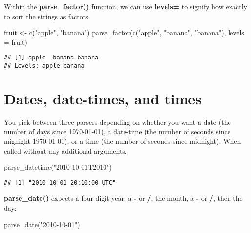 \documentclass[
]{article}
\newenvironment{Shaded}{\begin{snugshade}}{\end{snugshade}}
\newcommand{\AttributeTok}[1]{\textcolor[rgb]{0.77,0.63,0.00}{#1}}
\newcommand{\FunctionTok}[1]{\textcolor[rgb]{0.00,0.00,0.00}{#1}}
\newcommand{\NormalTok}[1]{#1}
\newcommand{\OtherTok}[1]{\textcolor[rgb]{0.56,0.35,0.01}{#1}}
\newcommand{\StringTok}[1]{\textcolor[rgb]{0.31,0.60,0.02}{#1}}
\begin{document}
Within the \textbf{parse\_factor()} function, we can use
\textbf{levels=} to signify how exactly to sort the strings as factors.

\begin{Shaded}
\begin{Highlighting}[]
\NormalTok{fruit }\OtherTok{\textless{}{-}} \FunctionTok{c}\NormalTok{(}\StringTok{"apple"}\NormalTok{, }\StringTok{"banana"}\NormalTok{)}
\FunctionTok{parse\_factor}\NormalTok{(}\FunctionTok{c}\NormalTok{(}\StringTok{"apple"}\NormalTok{, }\StringTok{"banana"}\NormalTok{, }\StringTok{"banana"}\NormalTok{), }\AttributeTok{levels =}\NormalTok{ fruit)}
\end{Highlighting}
\end{Shaded}

\begin{verbatim}
## [1] apple  banana banana
## Levels: apple banana
\end{verbatim}

\hypertarget{dates-date-times-and-times}{%
\section{\texorpdfstring{\textbf{Dates, date-times, and
times}}{Dates, date-times, and times}}\label{dates-date-times-and-times}}

You pick between three parsers depending on whether you want a date (the
number of days since 1970-01-01), a date-time (the number of seconds
since mignight 1970-01-01), or a time (the number of seconds since
midnight). When called without any additional arguments.

\begin{Shaded}
\begin{Highlighting}[]
\FunctionTok{parse\_datetime}\NormalTok{(}\StringTok{"2010{-}10{-}01T2010"}\NormalTok{)}
\end{Highlighting}
\end{Shaded}

\begin{verbatim}
## [1] "2010-10-01 20:10:00 UTC"
\end{verbatim}

\textbf{parse\_date()} expects a four digit year, a \textbf{-} or
\textbf{/}, the month, a \textbf{-} or \textbf{/}, then the day:

\begin{Shaded}
\begin{Highlighting}[]
\FunctionTok{parse\_date}\NormalTok{(}\StringTok{"2010{-}10{-}01"}\NormalTok{)}
\end{Highlighting}
\end{Shaded}
\end{document}
